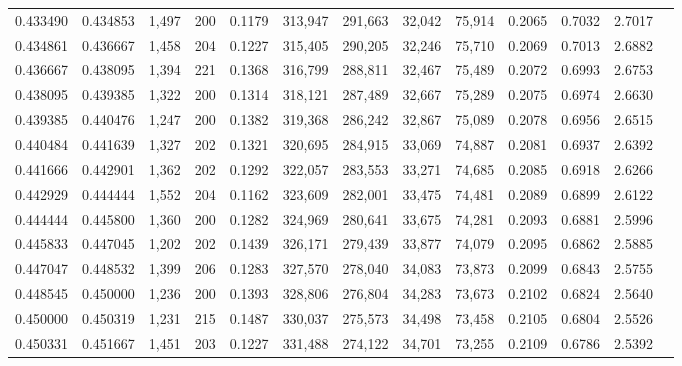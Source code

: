 \begin{tabular}{rrrrrrrrrrrrr}
0.433490 & 0.434853 &  1,497 &   200 &                                     0.1179 & 313,947 & 291,663 &  32,042 &  75,914 & 0.2065 & 0.7032 & 2.7017 \\
0.434861 & 0.436667 &  1,458 &   204 &                                     0.1227 & 315,405 & 290,205 &  32,246 &  75,710 & 0.2069 & 0.7013 & 2.6882 \\
0.436667 & 0.438095 &  1,394 &   221 &                                     0.1368 & 316,799 & 288,811 &  32,467 &  75,489 & 0.2072 & 0.6993 & 2.6753 \\
0.438095 & 0.439385 &  1,322 &   200 &                                     0.1314 & 318,121 & 287,489 &  32,667 &  75,289 & 0.2075 & 0.6974 & 2.6630 \\
0.439385 & 0.440476 &  1,247 &   200 &                                     0.1382 & 319,368 & 286,242 &  32,867 &  75,089 & 0.2078 & 0.6956 & 2.6515 \\
0.440484 & 0.441639 &  1,327 &   202 &                                     0.1321 & 320,695 & 284,915 &  33,069 &  74,887 & 0.2081 & 0.6937 & 2.6392 \\
0.441666 & 0.442901 &  1,362 &   202 &                                     0.1292 & 322,057 & 283,553 &  33,271 &  74,685 & 0.2085 & 0.6918 & 2.6266 \\
0.442929 & 0.444444 &  1,552 &   204 &                                     0.1162 & 323,609 & 282,001 &  33,475 &  74,481 & 0.2089 & 0.6899 & 2.6122 \\
0.444444 & 0.445800 &  1,360 &   200 &                                     0.1282 & 324,969 & 280,641 &  33,675 &  74,281 & 0.2093 & 0.6881 & 2.5996 \\
0.445833 & 0.447045 &  1,202 &   202 &                                     0.1439 & 326,171 & 279,439 &  33,877 &  74,079 & 0.2095 & 0.6862 & 2.5885 \\
0.447047 & 0.448532 &  1,399 &   206 &                                     0.1283 & 327,570 & 278,040 &  34,083 &  73,873 & 0.2099 & 0.6843 & 2.5755 \\
0.448545 & 0.450000 &  1,236 &   200 &                                     0.1393 & 328,806 & 276,804 &  34,283 &  73,673 & 0.2102 & 0.6824 & 2.5640 \\
0.450000 & 0.450319 &  1,231 &   215 &                                     0.1487 & 330,037 & 275,573 &  34,498 &  73,458 & 0.2105 & 0.6804 & 2.5526 \\
0.450331 & 0.451667 &  1,451 &   203 &                                     0.1227 & 331,488 & 274,122 &  34,701 &  73,255 & 0.2109 & 0.6786 & 2.5392 \\

\end{tabular}
